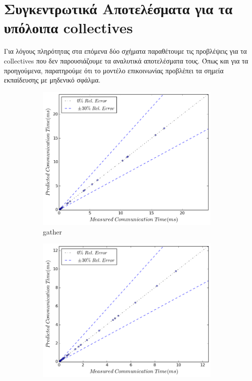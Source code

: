 \section{Συγκεντρωτικά Αποτελέσματα για τα υπόλοιπα collectives}
Για λόγους πληρότητας στα επόμενα δύο σχήματα παραθέτουμε τις προβλέψεις για τα collectives που δεν παρουσιάζουμε τα αναλυτικά αποτελέσματα τους. Όπως και για τα προηγούμενα, παρατηρούμε ότι το μοντέλο επικοινωνίας προβλέπει τα σημεία εκπαίδευσης με μηδενικό σφάλμα.
\begin{figure}[H]
    \centering
    \captionsetup{justification=centering,margin=0cm,font=footnotesize}
    \begin{subfigure}[b]{0.4\textwidth}
        \includegraphics[width=\textwidth]{./images/all_UMA/gather.png}
        \caption{gather}
    \end{subfigure}
    \quad 
    \begin{subfigure}[b]{0.4\textwidth}
        \includegraphics[width=\textwidth]{./images/all_UMA/reduce.png}

\end{subfigure}
\end{figure}
